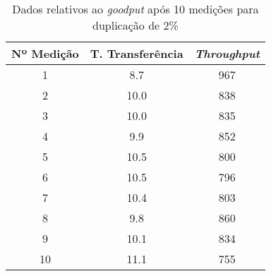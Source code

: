 \begin{table}[!ht]
\centering

\begin{tabular}{c c c}
\toprule
\toprule
	Nº Medição & T. Transferência & \emph{Throughput} \\ 
\midrule
1 & 8.7 & 967\\
2 & 10.0 & 838\\
3 & 10.0 & 835\\
4 & 9.9 & 852\\
5 & 10.5 & 800\\
6 & 10.5 & 796\\
7 & 10.4 & 803\\
8 & 9.8 & 860\\
9 & 10.1 & 834\\
10 & 11.1 & 755\\
\bottomrule
\end{tabular}
\caption{Dados relativos ao \emph{goodput} após 10 medições para duplicação de 2\%}
\label{tab:dup2}
\end{table}
